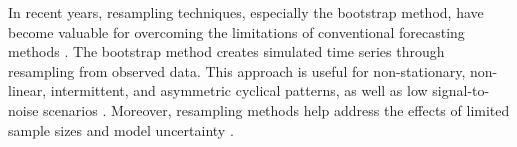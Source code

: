 \documentclass[ijoc,sglanonrev]{informs4}
\begin{document}


In recent years, resampling techniques, especially the bootstrap method, have become valuable for overcoming the limitations of conventional forecasting methods \citep{hasni2019spare}. The bootstrap method creates simulated time series through resampling from observed data. This approach is useful for non-stationary, non-linear, intermittent, and asymmetric cyclical patterns, as well as low signal-to-noise scenarios \citep{feliu2024enhancing, suman2024deep, kreiss2012bootstrap}. Moreover, resampling methods help address the effects of limited sample sizes \citep{davison1997bootstrap}  and model uncertainty \citep{sarris2020exploiting}. 
\end{document}
